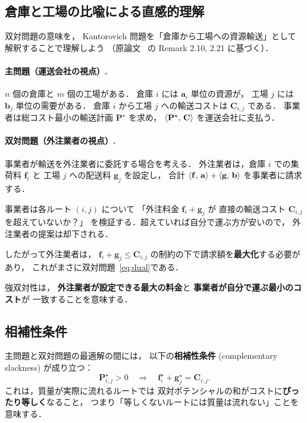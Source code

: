 \subsection{倉庫と工場の比喩による直感的理解}\label{subsec:dual-intuition}

双対問題の意味を，
Kantorovich 問題を「倉庫から工場への資源輸送」として
解釈することで理解しよう
（原論文~\cite{PeyreCuturi2019} の Remark 2.10, 2.21 に基づく）．

\paragraph{主問題（運送会社の視点）.}
$n$ 個の倉庫と $m$ 個の工場がある．
倉庫 $i$ には $\mathbf{a}_i$ 単位の資源が，
工場 $j$ には $\mathbf{b}_j$ 単位の需要がある．
倉庫 $i$ から工場 $j$ への輸送コストは
$\mathbf{C}_{i,j}$ である．
事業者は総コスト最小の輸送計画 $\mathbf{P}^\star$ を求め，
$\langle \mathbf{P}^\star,\, \mathbf{C} \rangle$ を運送会社に支払う．

\paragraph{双対問題（外注業者の視点）.}
事業者が輸送を外注業者に委託する場合を考える．
外注業者は，倉庫 $i$ での集荷料 $\mathbf{f}_i$ と
工場 $j$ への配送料 $\mathbf{g}_j$ を設定し，
合計 $\langle \mathbf{f},\, \mathbf{a} \rangle + \langle \mathbf{g},\, \mathbf{b} \rangle$
を事業者に請求する．

事業者は各ルート $(i, j)$ について
「外注料金 $\mathbf{f}_i + \mathbf{g}_j$ が
直接の輸送コスト $\mathbf{C}_{i,j}$ を超えていないか？」
を検証する．超えていれば自分で運ぶ方が安いので，
外注業者の提案は却下される．

したがって外注業者は，
$\mathbf{f}_i + \mathbf{g}_j \leq \mathbf{C}_{i,j}$
の制約の下で請求額を\textbf{最大化}する必要があり，
これがまさに双対問題~\eqref{eq:dual}である．

強双対性は，
\textbf{外注業者が設定できる最大の料金}と
\textbf{事業者が自分で運ぶ最小のコスト}が
一致することを意味する．

\subsection{相補性条件}\label{subsec:complementary-slackness}

主問題と双対問題の最適解の間には，
以下の\textbf{相補性条件} (complementary slackness) が成り立つ：
\begin{equation}\label{eq:complementary}
  \mathbf{P}^\star_{i,j} > 0
  \quad \Longrightarrow \quad
  \mathbf{f}^\star_i + \mathbf{g}^\star_j = \mathbf{C}_{i,j}.
\end{equation}
これは，質量が実際に流れるルートでは
双対ポテンシャルの和がコストに\textbf{ぴったり等しく}なること，
つまり「等しくないルートには質量は流れない」ことを意味する．

